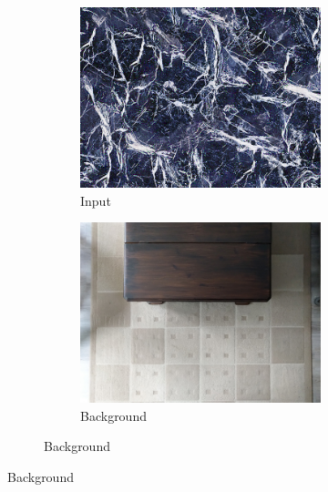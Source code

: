 \begin{figure}[]
    \centering    
    \begin{subfigure}{\textwidth}
        \centering
        \begin{subfigure}{0.24\textwidth}
            \centering
            \includegraphics[width=\textwidth]{images/04-experiment02/carpet/marble/target.jpg}
            \caption*{Input}
        \end{subfigure}
        \hfill
        \begin{subfigure}{0.24\textwidth}
            \centering
            \includegraphics[width=\textwidth]{images/04-experiment02/carpet/bg.jpg}
            \caption*{Background}

\end{subfigure}
\end{subfigure}
\end{figure}
